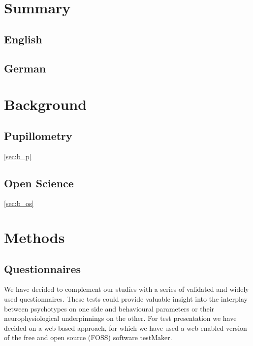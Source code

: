 
\chapter{Summary}
    \section{English}
	\readme
    \section{German}
	\readme
\chapter{Background}
    \section{Pupillometry}\ref{sec:b_p}
    \section{Open Science}\ref{sec:b_os}
\chapter{Methods}
    \section{Questionnaires}
	We have decided to complement our studies with a series of validated and widely used questionnaires.
	These tests could provide valuable insight into the interplay between psychotypes on one side and behavioural parameters or their neurophysiological underpinnings on the other.
	For test presentation we have decided on a web-based approach, for which we have used a web-enabled version of the free and open source (FOSS) software testMaker\cite{testmaker}.
	

